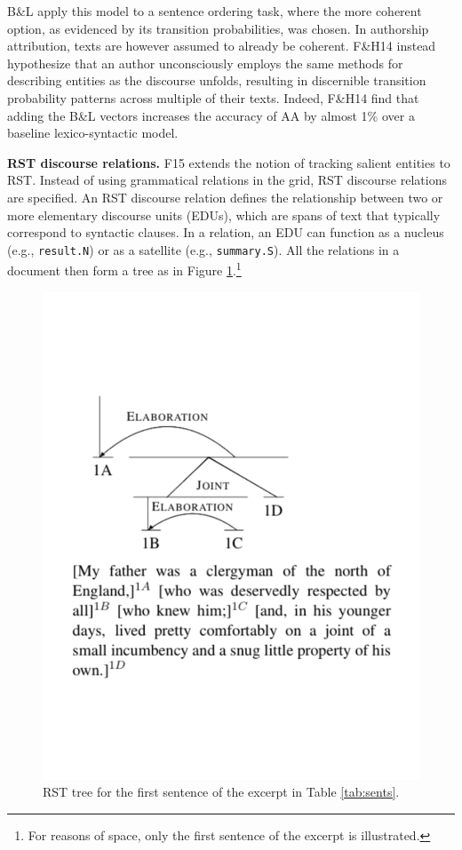 B\&L apply this model to a sentence ordering task, where the more coherent option, as evidenced by its transition probabilities, was chosen. In authorship attribution, texts are however assumed to already be coherent. F\&H14 instead hypothesize that an author unconsciously employs the same methods for describing entities as the discourse unfolds, resulting in discernible transition probability patterns across multiple of their texts. Indeed, F\&H14 find that adding the B\&L vectors increases the accuracy of AA by almost 1\% over a baseline lexico-syntactic model.
\medskip

\noindent\textbf{RST discourse relations.} F15 extends the notion of tracking salient entities to RST. Instead of using grammatical relations in the grid, RST discourse relations are specified. An RST discourse relation defines the relationship between two or more elementary discourse units (EDUs), which are spans of text that typically correspond to syntactic clauses. In a relation, an EDU can function as a nucleus (e.g., \texttt{result.N}) or as a satellite (e.g., \texttt{summary.S}). All the relations in a document then form a tree as in Figure \ref{fig:rstTree}.\footnote{For reasons of space, only the first sentence of the excerpt is illustrated.}

\begin{figure}
\vspace{-5em}
\includegraphics[scale=0.3]{plots/longer2_rstTree.pdf}
\vspace{-5.5em}
\caption{RST tree for the first sentence of the excerpt in Table \ref{tab:sents}.}
\label{fig:rstTree}
\end{figure}

